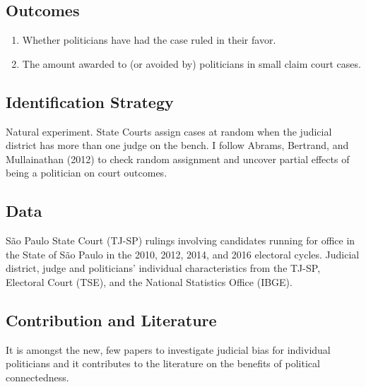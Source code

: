 \documentclass[]{article}
\begin{document}
\hypertarget{outcomes}{%
\subsection{Outcomes}\label{outcomes}}

\begin{enumerate}
\item
  Whether politicians have had the case ruled in their favor.
\item
  The amount awarded to (or avoided by) politicians in small claim court
  cases.
\end{enumerate}

\hypertarget{identification-strategy}{%
\subsection{Identification Strategy}\label{identification-strategy}}

Natural experiment. State Courts assign cases at random when the
judicial district has more than one judge on the bench. I follow Abrams,
Bertrand, and Mullainathan (2012) to check random assignment and uncover
partial effects of being a politician on court outcomes.

\hypertarget{data}{%
\subsection{Data}\label{data}}

São Paulo State Court (TJ-SP) rulings involving candidates running for
office in the State of São Paulo in the 2010, 2012, 2014, and 2016
electoral cycles. Judicial district, judge and politicians' individual
characteristics from the TJ-SP, Electoral Court (TSE), and the National
Statistics Office (IBGE).

\hypertarget{contribution-and-literature}{%
\subsection{Contribution and
Literature}\label{contribution-and-literature}}

It is amongst the new, few papers to investigate judicial bias for
individual politicians and it contributes to the literature on the
benefits of political connectedness.
\end{document}
